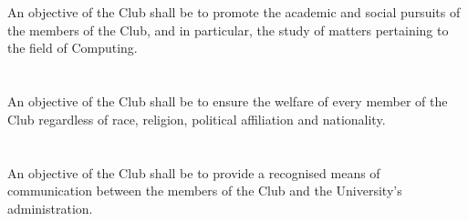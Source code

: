 
\section{}
An objective of the Club shall be to promote the academic and social pursuits of the members of the Club, and in particular, the study of matters pertaining to the field of Computing.

\section{}
An objective of the Club shall be to ensure the welfare of every member of the Club regardless of race, religion, political affiliation and nationality.

\section{}
An objective of the Club shall be to provide a recognised means of communication between the members of the Club and the University's administration.
